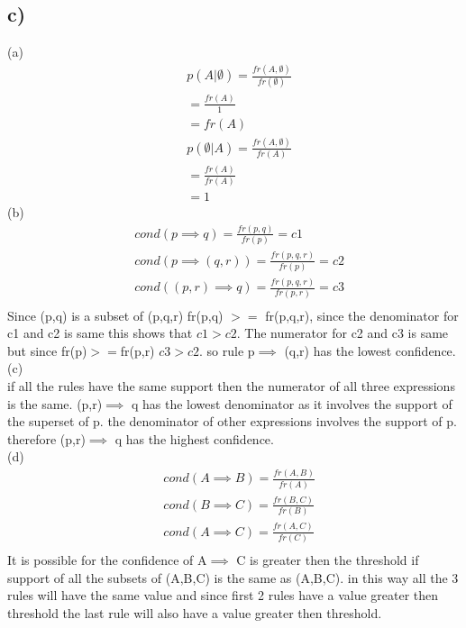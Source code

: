 \documentclass[10pt,a4paper]{article}
\begin{document}
\subsection*{c)}
(a)\\
\begin{align*}
& p(A|\emptyset) = \frac{fr(A,\emptyset)}{fr(\emptyset)}\\
& = \frac{fr(A)}{1}\\
& = fr(A)\\
& p(\emptyset|A) = \frac{fr(A,\emptyset)}{fr(A)}\\
& = \frac{fr(A)}{fr(A)}\\
& = 1
\end{align*}
(b)\\
\begin{align*}
& cond(p\implies q)=\frac{fr(p,q)}{fr(p)} = c1\\
& cond(p\implies (q,r))=\frac{fr(p,q,r)}{fr(p)} = c2\\
& cond((p,r)\implies q)=\frac{fr(p,q,r)}{fr(p,r)} = c3\\
\end{align*}
Since (p,q) is a subset of (p,q,r) fr(p,q) $>=$ fr(p,q,r), since the denominator for c1 and c2 is same this shows that $c1 > c2$. The numerator for c2 and c3 is same but since fr(p)$>=$fr(p,r) $c3 > c2$. so rule p$\implies$ (q,r) has the lowest confidence.\\
(c)\\
if all the rules have the same support then the numerator of all three expressions is the same. (p,r)$\implies$ q has the lowest denominator as it involves the support of  the superset of p. the denominator of other expressions involves the support of p. therefore (p,r)$\implies$ q has the highest confidence.\\
(d)\\
\begin{align*}
& cond(A\implies B)=\frac{fr(A,B)}{fr(A)}\\
& cond(B\implies C)=\frac{fr(B,C)}{fr(B)}\\
& cond(A\implies C)=\frac{fr(A,C)}{fr(C)}\\
\end{align*}
It is possible for the confidence of A$\implies$ C is greater then the threshold if support of all the subsets of (A,B,C) is the same as (A,B,C). in this way all the 3 rules will have the same value and since first 2 rules have a value greater then threshold the last rule will also have a value greater then threshold.\\
\end{document}
